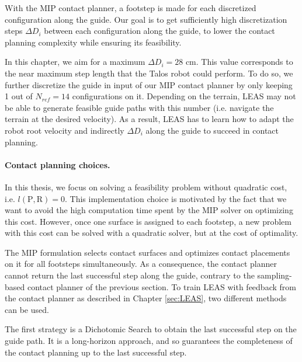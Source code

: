 With the MIP contact planner, a footstep is made for each discretized configuration along the guide.
Our goal is to get sufficiently high discretization steps $\Delta D_i$ between each configuration along the guide, to lower the contact planning complexity while ensuring its feasibility.

In this chapter, we aim for a maximum $\Delta D_i =28$ cm. 
This value corresponds to the near maximum step length that the Talos robot could perform.
To do so, we further discretize the guide in input of our MIP contact planner by only keeping 1 out of $N_{ref}=14$ configurations on it.
Depending on the terrain, LEAS may not be able to generate feasible guide paths with this number (i.e. navigate the terrain at the desired velocity).
As a result, LEAS has to learn how to adapt the robot root velocity and indirectly $\Delta D_i$ along the guide to succeed in contact planning.


\paragraph{Contact planning choices.}

In this thesis, we focus on solving a feasibility problem without quadratic cost, i.e. $l(\mbox{P},\mbox{R})=0$.
This implementation choice is motivated by the fact that we want to avoid the high computation time spent by the MIP solver on optimizing this cost.
However, once one surface is assigned to each footstep, a new problem with this cost can be solved with a quadratic solver, but at the cost of optimality.

The MIP formulation selects contact surfaces and optimizes contact placements on it for all footsteps simultaneously.
As a consequence, the contact planner cannot return the last successful step along the guide, contrary to the sampling-based contact planner of the previous section.
To train LEAS with feedback from the contact planner as described in Chapter \ref{sec:LEAS}, two different methods can be used.

The first strategy is a Dichotomic Search to obtain the last successful step on the guide path. 
It is a long-horizon approach, and so guarantees the completeness of the contact planning up to the last successful step. %

